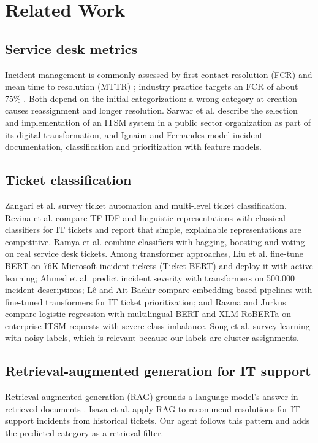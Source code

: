 \documentclass[conference]{IEEEtran}
\begin{document}
\section{Related Work}

\subsection{Service desk metrics}
Incident management is commonly assessed by first contact resolution (FCR) and mean time to resolution
(MTTR) \cite{itil4}; industry practice targets an FCR of about 75\% \cite{zendesk}. Both depend on the
initial categorization: a wrong category at creation causes reassignment and longer resolution. Sarwar et al.
\cite{sarwar2023} describe the selection and implementation of an ITSM system in a public sector
organization as part of its digital transformation, and Ignaim and Fernandes \cite{ignaim2024} model incident
documentation, classification and prioritization with feature models.

\subsection{Ticket classification}
Zangari et al. \cite{zangari2023} survey ticket automation and multi-level ticket classification. Revina et
al. \cite{revina2020} compare TF-IDF and linguistic representations with classical classifiers for IT
tickets and report that simple, explainable representations are competitive. Ramya et al.
\cite{ramya2018} combine classifiers with bagging, boosting and voting on real service desk tickets. Among
transformer approaches, Liu et al. \cite{liu2023ticketbert} fine-tune BERT on 76K Microsoft incident tickets
(Ticket-BERT) and deploy it with active learning; Ahmed et al. \cite{ahmed2022} predict incident severity with
transformers on 500,000 incident descriptions; Lê and Ait Bachir \cite{le2025} compare embedding-based
pipelines with fine-tuned transformers for IT ticket prioritization; and Razma and Jurkus \cite{razma2026}
compare logistic regression with multilingual BERT and XLM-RoBERTa on enterprise ITSM requests with severe
class imbalance. Song et al. \cite{song2023} survey learning with noisy labels, which is relevant because our
labels are cluster assignments.

\subsection{Retrieval-augmented generation for IT support}
Retrieval-augmented generation (RAG) grounds a language model's answer in retrieved documents \cite{lewis2020}.
Isaza et al. \cite{isaza2024} apply RAG to recommend resolutions for IT support incidents from historical
tickets. Our agent follows this pattern and adds the predicted category as a retrieval filter.
\end{document}
